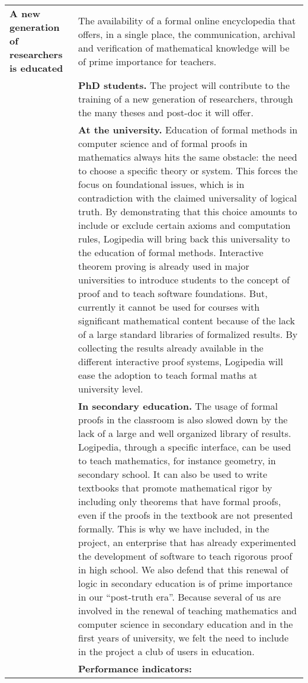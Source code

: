 \begin{longtable}{|p{}|p{}|}
\hline
{\bf A new generation of researchers is educated}
&
The availability of a formal online encyclopedia that offers, in a
single place, the communication, archival and verification of
mathematical knowledge will be of prime importance for teachers.\\
&
{\bf PhD students.} The project will contribute to the training of a new
generation of researchers, through the many theses and post-doc it will
offer.\\
&
{\bf At the university.}
Education of formal methods in computer science and of formal proofs
in mathematics always hits the same obstacle: the need to choose a
specific theory or system. This forces the focus on foundational issues,
which is in contradiction with the claimed universality of logical truth.
By demonstrating that this choice amounts to include or exclude 
certain axioms and computation rules, Logipedia will bring back this
universality to the education of formal methods.  Interactive
theorem proving is already used in major universities to introduce
students to the concept of proof and to teach software foundations.
But, currently it cannot be used for courses with significant
mathematical content because of the lack of a large standard libraries
of formalized results.  By collecting the results already available in
the different interactive proof systems, Logipedia will ease the
adoption to teach formal maths at university level.
\\
&
{\bf In secondary education.}
The usage of formal proofs in the classroom is also slowed down by the
lack of a large and well organized library of results.  Logipedia,
through a specific interface, can be used to teach mathematics, for
instance geometry, in secondary school.  It can also be used to write
textbooks that promote mathematical rigor by including only
theorems that have formal proofs, even if the proofs in the textbook
are not presented formally.
This is why we have included, in the project, an enterprise that has
already experimented the development of software to teach rigorous proof
in high school.
We also defend that this renewal of logic in secondary education
is of prime importance in our ``post-truth era''.
Because several of us are involved in the renewal of teaching
mathematics and computer science in secondary education and in the
first years of university, we felt the need to include in the project
a club of users in education.
\\
&
\colorbox{color2}{\bf Performance indicators:}

\end{longtable}
